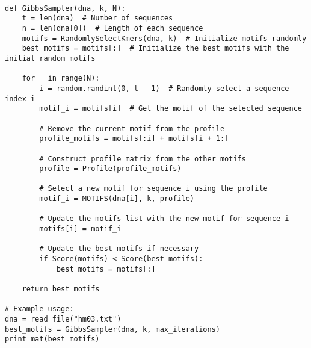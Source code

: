 \begin{verbatim}

def GibbsSampler(dna, k, N):
    t = len(dna)  # Number of sequences
    n = len(dna[0])  # Length of each sequence
    motifs = RandomlySelectKmers(dna, k)  # Initialize motifs randomly
    best_motifs = motifs[:]  # Initialize the best motifs with the initial random motifs

    for _ in range(N):
        i = random.randint(0, t - 1)  # Randomly select a sequence index i
        motif_i = motifs[i]  # Get the motif of the selected sequence

        # Remove the current motif from the profile
        profile_motifs = motifs[:i] + motifs[i + 1:]

        # Construct profile matrix from the other motifs
        profile = Profile(profile_motifs)

        # Select a new motif for sequence i using the profile
        motif_i = MOTIFS(dna[i], k, profile)

        # Update the motifs list with the new motif for sequence i
        motifs[i] = motif_i

        # Update the best motifs if necessary
        if Score(motifs) < Score(best_motifs):
            best_motifs = motifs[:]

    return best_motifs

# Example usage:
dna = read_file("hm03.txt")
best_motifs = GibbsSampler(dna, k, max_iterations)
print_mat(best_motifs)

\end{verbatim}